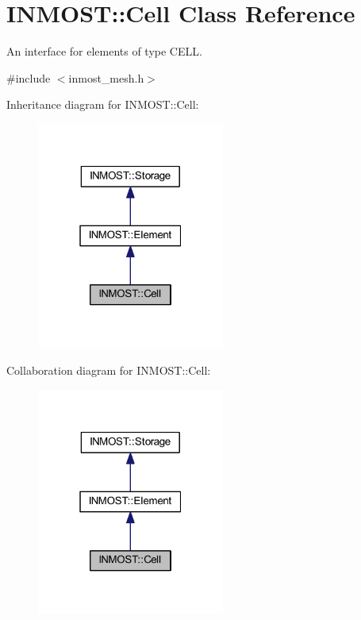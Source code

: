 \hypertarget{classINMOST_1_1Cell}{\section{I\-N\-M\-O\-S\-T\-:\-:Cell Class Reference}
\label{classINMOST_1_1Cell}
}


An interface for elements of type C\-E\-L\-L.  




{\ttfamily \#include $<$inmost\-\_\-mesh.\-h$>$}



Inheritance diagram for I\-N\-M\-O\-S\-T\-:\-:Cell\-:\nopagebreak
\begin{figure}[H]
\begin{center}
\leavevmode
\includegraphics[width=175pt]{classINMOST_1_1Cell__inherit__graph}
\end{center}
\end{figure}


Collaboration diagram for I\-N\-M\-O\-S\-T\-:\-:Cell\-:\nopagebreak
\begin{figure}[H]
\begin{center}
\leavevmode
\includegraphics[width=175pt]{classINMOST_1_1Cell__coll__graph}
\end{center}
\end{figure}
